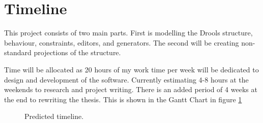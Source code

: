 \section{Timeline}

This project consists of two main parts.
First is modelling the Drools structure, behaviour, constraints, editors, and generators.
The second will be creating non-standard projections of the structure.

Time will be allocated as 20 hours of my work time per week will be dedicated to design and development of the software.
Currently estimating 4-8 hours at the weekends to research and project writing.
There is an added period of 4 weeks at the end to rewriting the thesis.
This is shown in the Gantt Chart in figure \ref{fig:ganttchart}

\begin{figure}[H]
    \centering
    \caption{Predicted timeline.}
    \label{fig:ganttchart}
\end{figure}
